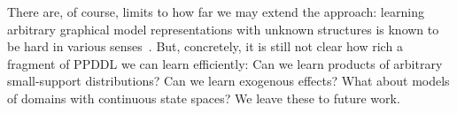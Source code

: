 \documentclass[letterpaper]{article} %
\begin{document}
There are, of course, limits to how far we may extend the approach: learning arbitrary graphical model representations with unknown structures is known to be hard in various senses~\cite{chickering1996learning,chickering2004large}. But, concretely, it is still not clear how rich a fragment of PPDDL we can learn efficiently: Can we learn products of arbitrary small-support distributions? Can we learn exogenous effects?  What about models of domains with continuous state spaces? We leave these to future work.






\end{document}
